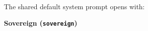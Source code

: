 \documentclass[11pt, a4paper]{article}
\newenvironment{promptquote}{%
  \begin{quote}\small
}{%
  \end{quote}
}
\begin{document}
The shared default system prompt opens with:



\bigskip
\textbf{Sovereign (\texttt{sovereign})}


\end{document}

